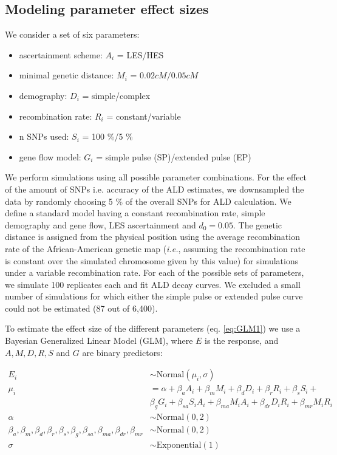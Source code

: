 \documentclass[11pt]{article}
\begin{document}
\subsection{Modeling parameter effect sizes}\label{modeling prameter effect sizes}

We consider a set of six parameters:
\begin{itemize} 
    \item ascertainment scheme: $A_i$ = LES/HES
    \item minimal genetic distance: $M_i$ = $0.02 cM/ 0.05 cM$
    \item demography: $D_i$ = simple/complex
    \item recombination rate: $R_i$ = constant/variable
    \item n SNPs used: $S_i$ = 100 \%/5 \%
    \item gene flow model: $G_i$ = simple pulse (SP)/extended pulse (EP)
\end{itemize}

We perform simulations using all possible parameter combinations. For the effect of the amount of SNPs i.e. accuracy of the ALD estimates, we downsampled the data by randomly choosing 5 \% of the overall SNPs for ALD calculation.
We define a standard model having a constant recombination rate, simple demography and gene flow, LES ascertainment and $d_0 = 0.05$.
The genetic distance is assigned from the physical  position using the average recombination rate of the African-American genetic map (\emph{i.e.}, assuming the recombination rate is constant over the simulated chromosome given by this value) for simulations under a variable recombination rate.
For each of the possible sets of parameters, we simulate 100 replicates each and fit ALD decay curves. We excluded a small number of simulations for which either the simple pulse or extended pulse  curve could not be estimated (87 out of 6,400). 



To estimate the effect size of the different parameters (eq.
\ref{eq:GLM1}) we use a Bayesian Generalized Linear Model (GLM), where $E$ is the response, and $A, M, D, R, S$ and $G$ are binary predictors:

\begin{equation}\label{eq:GLM1}
\begin{split}
E_i &\sim \text{Normal}(\mu_i,\sigma) \\
\mu_i &= \alpha + \beta_aA_i + \beta_mM_i + \beta_dD_i + \beta_rR_i + \beta_{s}S_i + \\ &\beta_gG_i + \beta_{sa}S_iA_i + \beta_{ma}M_iA_i + \beta_{dr}D_iR_i + \beta_{mr}M_iR_i \\
\alpha &\sim \text{Normal}(0,2) \\
\beta_a,\beta_m,\beta_d,\beta_r,\beta_{s},\beta_g,\beta_{sa}, \beta_{ma},\beta_{dr}, \beta_{mr} &\sim \text{Normal}(0,2) \\
\sigma &\sim \text{Exponential}(1)
\end{split}
\end{equation}
\end{document}

